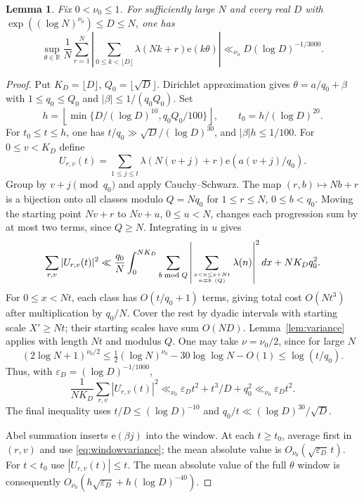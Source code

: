 \documentclass[11pt]{article}
\newtheorem{lemma}[theorem]{Lemma}
\theoremstyle{definition}
\newcommand{\e}{\mathrm e}
\newcommand{\R}{\mathbb R}
\newcommand{\abs}[1]{\left\lvert#1\right\rvert}
\begin{document}
\begin{lemma}\label{lem:fourier}
Fix $0<\nu_0\le1$. For sufficiently large $N$ and every real $D$ with
$\exp((\log N)^{\nu_0})\le D\le N$, one has
\begin{equation}\label{eq:fourier}
 \sup_{\theta\in\R}\frac1N\sum_{r=1}^N
   \abs{\sum_{0\le k<\lfloor D\rfloor}\lambda(Nk+r)\e(k\theta)}
 \ll_{\nu_0}D(\log D)^{-1/3000}.
\end{equation}
\end{lemma}
\begin{proof}
Put $K_D=\lfloor D\rfloor$, $Q_0=\lfloor\sqrt D\rfloor$.
Dirichlet approximation gives $\theta=a/q_0+\beta$ with
$1\le q_0\le Q_0$ and $|\beta|\le1/(q_0Q_0)$.
Set
\[
 h=\left\lfloor\min\{D/(\log D)^{10},q_0Q_0/100\}\right\rfloor,
 \qquad t_0=h/(\log D)^{20}.
\]
For $t_0\le t\le h$, one has
$t/q_0\gg\sqrt D/(\log D)^{30}$, and $|\beta|h\le1/100$.
For $0\le v<K_D$ define
\[
 U_{r,v}(t)=\sum_{1\le j\le t}\lambda(N(v+j)+r)
                                     \e(a(v+j)/q_0).
\]
Group by $v+j\pmod{q_0}$ and apply Cauchy--Schwarz.
The map $(r,b)\mapsto Nb+r$ is a bijection onto all classes modulo
$Q=Nq_0$ for $1\le r\le N$, $0\le b<q_0$.
Moving the starting point $Nv+r$ to $Nv+u$, $0\le u<N$, changes each
progression sum by at most two terms, since $Q\ge N$.
Integrating in $u$ gives
\begin{equation}\label{eq:startaverage}
 \sum_{r,v}|U_{r,v}(t)|^2
 \ll\frac{q_0}{N}\int_0^{NK_D}\sum_{b\bmod Q}
   \abs{\sum_{x<n\le x+Nt\atop n\equiv b\ (Q)}\lambda(n)}^2dx
   +NK_Dq_0^2.
\end{equation}
For $0\le x<Nt$, each class has $O(t/q_0+1)$ terms, giving total cost
$O(Nt^3)$ after multiplication by $q_0/N$.
Cover the rest by dyadic intervals with starting scale $X'\ge Nt$;
their starting scales have sum $O(ND)$.
Lemma~\ref{lem:variance} applies with length $Nt$ and modulus $Q$.
One may take $\nu=\nu_0/2$, since for large $N$
\[
 (2\log N+1)^{\nu_0/2}
 \le \tfrac12(\log N)^{\nu_0}-30\log\log N-O(1)
 \le\log(t/q_0).
\]
Thus, with $\varepsilon_D=(\log D)^{-1/1000}$,
\begin{equation}\label{eq:windowvariance}
 \frac1{NK_D}\sum_{r,v}|U_{r,v}(t)|^2
 \ll_{\nu_0}\varepsilon_Dt^2+t^3/D+q_0^2
 \ll_{\nu_0}\varepsilon_Dt^2.
\end{equation}
The final inequality uses $t/D\le(\log D)^{-10}$ and
$q_0/t\ll(\log D)^{30}/\sqrt D$.

Abel summation inserts $\e(\beta j)$ into the window.
At each $t\ge t_0$, average first in $(r,v)$ and use
\eqref{eq:windowvariance}; the mean absolute value is
$O_{\nu_0}(\sqrt{\varepsilon_D}\,t)$.
For $t<t_0$ use $|U_{r,v}(t)|\le t$.
The mean absolute value of the full $\theta$ window is consequently
$O_{\nu_0}(h\sqrt{\varepsilon_D}+h(\log D)^{-40})$.


\end{proof}
\end{document}
